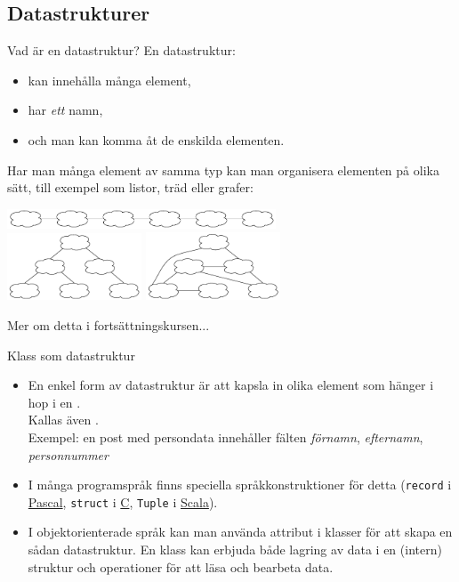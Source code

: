 \documentclass{lecturenotes}
\begin{document}
\subsection{Datastrukturer}
\begin{Slide}{Vad är en datastruktur?}
En datastruktur:

\begin{itemize}
\item kan innehålla många element,
\item har \emph{ett} namn,
\item och man kan komma åt de enskilda elementen.
\end{itemize}

Har man många element av samma typ kan man organisera elementen på olika sätt, till exempel som listor, träd eller grafer:
\begin{center}
\includegraphics[width=8cm]{img/lista.pdf}\\
\vspace{5mm}
\includegraphics[width=4cm]{img/trad.pdf}
\hspace{5mm}
\includegraphics[width=4cm]{img/graf.pdf}
\end{center}
Mer om detta i fortsättningskursen...
\end{Slide}

\begin{Slide}{Klass som datastruktur}
\begin{itemize}
\item En enkel form av datastruktur är att kapsla in olika element som hänger i hop i en  . \\Kallas även  . \\ Exempel: en post med persondata innehåller fälten \textit{förnamn}, \textit{efternamn}, \textit{personnummer}
\item I många programspråk finns speciella språkkonstruktioner för detta (\texttt{record} i \href{http://www.tutorialspoint.com/pascal/pascal_records.htm}{Pascal}, \texttt{struct} i \href{https://en.wikipedia.org/wiki/Struct_\%28C_programming_language\%29}{C}, \texttt{Tuple} i \href{http://www.tutorialspoint.com/scala/scala_tuples.htm}{Scala}). 
\item I objektorienterade språk kan man använda attribut i klasser för att skapa en sådan datastruktur. En klass kan erbjuda både lagring av data i en (intern) struktur och operationer för att läsa och bearbeta data. \\ 
\end{itemize}
\end{Slide}
\end{document}

